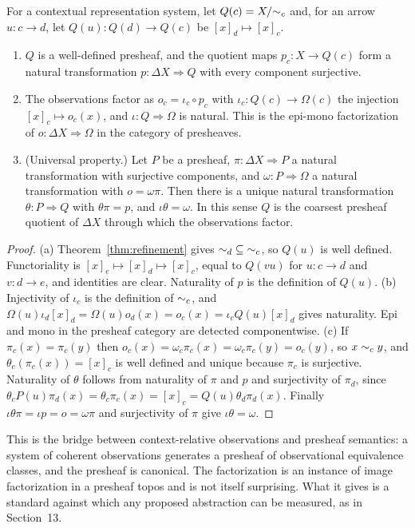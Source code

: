 \begin{theorem}\label{thm:canonical}
For a contextual representation system, let $Q(c)=X/{\sim_c}$ and, for an arrow $u:c\to d$, let $Q(u):Q(d)\to Q(c)$ be $[x]_d\mapsto[x]_c$.
\begin{enumerate}[label=(\alph*)]
\item $Q$ is a well-defined presheaf, and the quotient maps $p_c:X\to Q(c)$ form a natural transformation $p:\Delta X\Rightarrow Q$ with every component surjective.
\item The observations factor as $o_c=\iota_c\circ p_c$ with $\iota_c:Q(c)\to\Omega(c)$ the injection $[x]_c\mapsto o_c(x)$, and $\iota:Q\Rightarrow\Omega$ is natural. This is the epi-mono factorization of $o:\Delta X\Rightarrow\Omega$ in the category of presheaves.
\item (Universal property.) Let $P$ be a presheaf, $\pi:\Delta X\Rightarrow P$ a natural transformation with surjective components, and $\omega:P\Rightarrow\Omega$ a natural transformation with $o=\omega\pi$. Then there is a unique natural transformation $\theta:P\Rightarrow Q$ with $\theta\pi=p$, and $\iota\theta=\omega$. In this sense $Q$ is the coarsest presheaf quotient of $\Delta X$ through which the observations factor.
\end{enumerate}
\end{theorem}
\begin{proof}
(a) Theorem~\ref{thm:refinement} gives ${\sim_d}\subseteq{\sim_c}$, so $Q(u)$ is well defined. Functoriality is $[x]_e\mapsto[x]_d\mapsto[x]_c$, equal to $Q(vu)$ for $u:c\to d$ and $v:d\to e$, and identities are clear. Naturality of $p$ is the definition of $Q(u)$. (b) Injectivity of $\iota_c$ is the definition of $\sim_c$, and $\Omega(u)\iota_d[x]_d=\Omega(u)o_d(x)=o_c(x)=\iota_cQ(u)[x]_d$ gives naturality. Epi and mono in the presheaf category are detected componentwise. (c) If $\pi_c(x)=\pi_c(y)$ then $o_c(x)=\omega_c\pi_c(x)=\omega_c\pi_c(y)=o_c(y)$, so $x\sim_c y$, and $\theta_c(\pi_c(x))=[x]_c$ is well defined and unique because $\pi_c$ is surjective. Naturality of $\theta$ follows from naturality of $\pi$ and $p$ and surjectivity of $\pi_d$, since $\theta_cP(u)\pi_d(x)=\theta_c\pi_c(x)=[x]_c=Q(u)\theta_d\pi_d(x)$. Finally $\iota\theta\pi=\iota p=o=\omega\pi$ and surjectivity of $\pi$ give $\iota\theta=\omega$.
\end{proof}

This is the bridge between context-relative observations and presheaf semantics: a system of coherent observations generates a presheaf of observational equivalence classes, and the presheaf is canonical. The factorization is an instance of image factorization in a presheaf topos and is not itself surprising. What it gives is a standard against which any proposed abstraction can be measured, as in Section~13.

